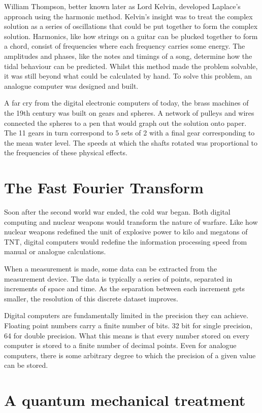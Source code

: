 William Thompson, better known later as Lord Kelvin, developed Laplace's approach using the harmonic method. Kelvin's insight was to treat the complex solution as a series of oscillations that could be put together to form the complex solution. Harmonics, like how strings on a guitar can be plucked together to form a chord, consist of frequencies where each frequency carries some energy. The amplitudes and phases, like the notes and timings of a song, determine how the tidal behaviour can be predicted. Whilst this method made the problem solvable, it was still beyond what could be calculated by hand. To solve this problem, an analogue computer was designed and built.


A far cry from the digital electronic computers of today, the brass machines of the 19th century was built on gears and spheres. A network of pulleys and wires connected the spheres to a pen that would graph out the solution onto paper. The 11 gears in turn correspond to 5 sets of 2 with a final gear corresponding to the mean water level. The speeds at which the shafts rotated was proportional to the frequencies of these physical effects. 

\section{The Fast Fourier Transform}


Soon after the second world war ended, the cold war began. Both digital computing and nuclear weapons would transform the nature of warfare. Like how nuclear weapons redefined the unit of explosive power to kilo and megatons of TNT, digital computers would redefine the information processing speed from manual or analogue calculations. 

When a measurement is made, some data can be extracted from the measurement device. The data is typically a series of points, separated in increments of space and time. As the separation between each increment gets smaller, the resolution of this discrete dataset improves. 

Digital computers are fundamentally limited in the precision they can achieve. Floating point numbers carry a finite number of bits. 32 bit for single precision, 64 for double precision. What this means is that every number stored on every computer is stored to a finite number of decimal points. Even for analogue computers, there is some arbitrary degree to which the precision of a given value can be stored. 

\section{A quantum mechanical treatment}

